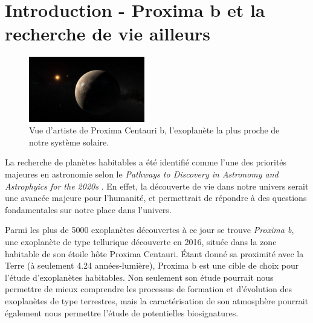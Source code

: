 
\section{\centering Introduction - Proxima b et la recherche de vie ailleurs}
\setlength{\columnsep}{1.3em}%
\begin{figure}
    \includegraphics[width=0.45\textwidth]{figures/art_proxb.jpg}
    \caption{Vue d'artiste de Proxima Centauri b, l'exoplanète la plus proche de notre système solaire.}
\end{figure}

La recherche de planètes habitables a été identifié comme l'une des priorités majeures en astronomie selon le \textsl{Pathways to Discovery in Astronomy and Astrophyics for the 2020s} \cite{NAP26141}. En effet, la découverte de vie dans notre univers serait une avancée majeure pour l'humanité, et permettrait de répondre à des questions fondamentales sur notre place dans l'univers. 

Parmi les plus de 5000 exoplanètes découvertes à ce jour se trouve \textsl{Proxima b}, une exoplanète de type tellurique découverte en 2016, située dans la zone habitable de son étoile hôte Proxima Centauri. Étant donné sa proximité avec la Terre (à seulement 4.24 années-lumière), Proxima b est une cible de choix pour l'étude d'exoplanètes habitables. Non seulement son étude pourrait nous permettre de mieux comprendre les processus de formation et d'évolution des exoplanètes de type terrestres, mais la caractérisation de son atmosphère pourrait également nous permettre l'étude de potentielles biosignatures.


